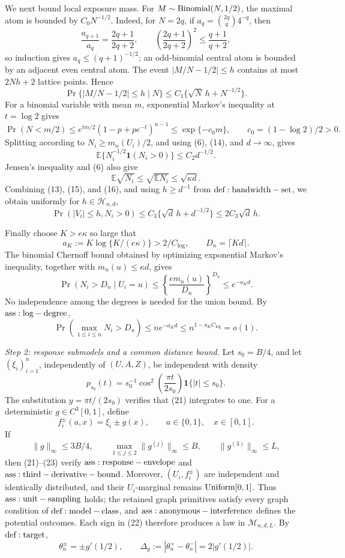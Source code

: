 We next bound local exposure mass.  For \(M\sim{\rm Binomial}(N,1/2)\), the maximal atom is bounded by \(C_0N^{-1/2}\).  Indeed, for \(N=2q\), if \(a_q={2q\choose q}4^{-q}\), then
\[
 \frac{a_{q+1}}{a_q}=\frac{2q+1}{2q+2},
 \qquad
 \left(\frac{2q+1}{2q+2}\right)^2\leq\frac{q+1}{q+2},
\tag{12}
\]
so induction gives \(a_q\leq(q+1)^{-1/2}\); an odd-binomial central atom is bounded by an adjacent even central atom.  The event \(|M/N-1/2|\leq h\) contains at most \(2Nh+2\) lattice points.  Hence
\[
 \Pr\{|M/N-1/2|\leq h\mid N\}
 \leq C_1\{\sqrt N\,h+N^{-1/2}\}.
\tag{13}
\]
For a binomial variable with mean \(m\), exponential Markov's inequality at \(t=\log2\) gives
\[
 \Pr(N<m/2)
 \leq e^{tm/2}(1-p+pe^{-t})^{n-1}
 \leq\exp\{-c_0m\},
 \qquad c_0=(1-\log2)/2>0.
\tag{14}
\]
Splitting according to \(N_i\geq m_n(U_i)/2\), and using (6), (14), and \(d\to\infty\), gives
\[
 \mathbb E\{N_i^{-1/2}\mathbf1(N_i>0)\}
 \leq C_2d^{-1/2}.
\tag{15}
\]
Jensen's inequality and (6) also give
\[
 \mathbb E\sqrt{N_i}\leq\sqrt{\mathbb EN_i}\leq\sqrt{\kappa d}.
\tag{16}
\]
Combining (13), (15), and (16), and using \(h\geq d^{-1}\) from \({\rm def:bandwidth-set}\), we obtain uniformly for \(h\in\mathcal H_{n,d}\),
\[
 \Pr(|V_i|\leq h,N_i>0)
 \leq C_3\{\sqrt d\,h+d^{-1/2}\}
 \leq2C_3\sqrt d\,h.
\tag{17}
\]

Finally choose \(K>e\kappa\) so large that
\[
 a_K:=K\log\{K/(e\kappa)\}>2/C_{\log},
 \qquad D_n=\lceil Kd\rceil.
\tag{18}
\]
The binomial Chernoff bound obtained by optimizing exponential Markov's inequality, together with \(m_n(u)\leq\kappa d\), gives
\[
 \Pr(N_i>D_n\mid U_i=u)
 \leq\left\{\frac{e m_n(u)}{D_n}\right\}^{D_n}
 \leq e^{-a_Kd}.
\tag{19}
\]
No independence among the degrees is needed for the union bound.  By \({\rm ass:log-degree}\),
\[
 \Pr\left(\max_{1\leq i\leq n}N_i>D_n\right)
 \leq ne^{-a_Kd}
 \leq n^{1-a_KC_{\log}}=o(1).
\tag{20}
\]

\textit{Step 2: response submodels and a common distance bound.}
Let \(s_0=B/4\), and let \((\xi_i)_{i=1}^n\), independently of \((U,A,Z)\), be independent with density
\[
 p_{s_0}(t)=s_0^{-1}\cos^2\!\left(\frac{\pi t}{2s_0}\right)
 \mathbf1\{|t|\leq s_0\}.
\tag{21}
\]
The substitution \(y=\pi t/(2s_0)\) verifies that (21) integrates to one.  For a deterministic \(g\in C^3[0,1]\), define
\[
 f_i^\pm(a,x)=\xi_i\pm g(x),
 \qquad a\in\{0,1\},\quad x\in[0,1].
\tag{22}
\]
If
\[
 \|g\|_\infty\leq3B/4,
 \qquad
 \max_{1\leq j\leq2}\|g^{(j)}\|_\infty\leq B,
 \qquad
 \|g^{(3)}\|_\infty\leq L,
\tag{23}
\]
then (21)--(23) verify \({\rm ass:response-envelope}\) and \({\rm ass:third-derivative-bound}\).  Moreover, \((U_i,f_i^\pm)\) are independent and identically distributed, and their \(U_i\)-marginal remains \({\rm Uniform}[0,1]\).  Thus \({\rm ass:unit-sampling}\) holds; the retained graph primitives satisfy every graph condition of \({\rm def:model-class}\), and \({\rm ass:anonymous-interference}\) defines the potential outcomes.  Each sign in (22) therefore produces a law in \(\mathcal M_{n,d,L}\).  By \({\rm def:target}\),
\[
 \theta_n^\pm=\pm g'(1/2),
 \qquad
 \Delta_g:=|\theta_n^+-\theta_n^-|=2|g'(1/2)|.
\tag{24}
\]

